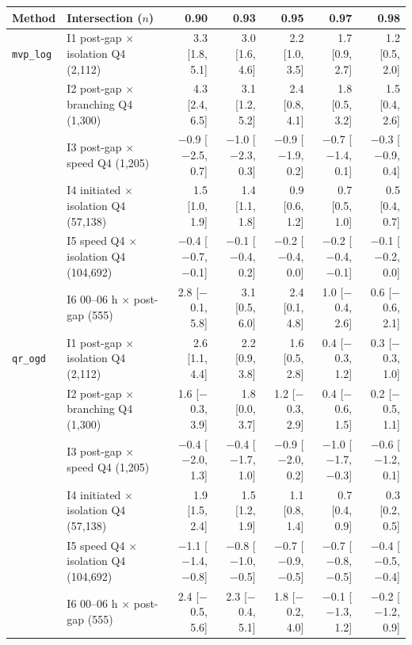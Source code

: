 \setlength{\tabcolsep}{3.4pt}
\begin{tabular}{@{}llrrrrr@{}}
\toprule
Method & Intersection ($n$) & 0.90 & 0.93 & 0.95 & 0.97 & 0.98 \\
\midrule
\texttt{mvp\_log} & I1 post-gap $\times$ isolation Q4 (2{,}112) & 3.3 [1.8, 5.1] & 3.0 [1.6, 4.6] & 2.2 [1.0, 3.5] & 1.7 [0.9, 2.7] & 1.2 [0.5, 2.0] \\
 & I2 post-gap $\times$ branching Q4 (1{,}300) & 4.3 [2.4, 6.5] & 3.1 [1.2, 5.2] & 2.4 [0.8, 4.1] & 1.8 [0.5, 3.2] & 1.5 [0.4, 2.6] \\
 & I3 post-gap $\times$ speed Q4 (1{,}205) & $-$0.9 [$-$2.5, 0.7] & $-$1.0 [$-$2.3, 0.3] & $-$0.9 [$-$1.9, 0.2] & $-$0.7 [$-$1.4, 0.1] & $-$0.3 [$-$0.9, 0.4] \\
 & I4 initiated $\times$ isolation Q4 (57{,}138) & 1.5 [1.0, 1.9] & 1.4 [1.1, 1.8] & 0.9 [0.6, 1.2] & 0.7 [0.5, 1.0] & 0.5 [0.4, 0.7] \\
 & I5 speed Q4 $\times$ isolation Q4 (104{,}692) & $-$0.4 [$-$0.7, $-$0.1] & $-$0.1 [$-$0.4, 0.2] & $-$0.2 [$-$0.4, 0.0] & $-$0.2 [$-$0.4, $-$0.1] & $-$0.1 [$-$0.2, 0.0] \\
 & I6 00--06 h $\times$ post-gap (555) & 2.8 [$-$0.1, 5.8] & 3.1 [0.5, 6.0] & 2.4 [0.1, 4.8] & 1.0 [$-$0.4, 2.6] & 0.6 [$-$0.6, 2.1] \\
\addlinespace[2pt]
\texttt{qr\_ogd} & I1 post-gap $\times$ isolation Q4 (2{,}112) & 2.6 [1.1, 4.4] & 2.2 [0.9, 3.8] & 1.6 [0.5, 2.8] & 0.4 [$-$0.3, 1.2] & 0.3 [$-$0.3, 1.0] \\
 & I2 post-gap $\times$ branching Q4 (1{,}300) & 1.6 [$-$0.3, 3.9] & 1.8 [0.0, 3.7] & 1.2 [$-$0.3, 2.9] & 0.4 [$-$0.6, 1.5] & 0.2 [$-$0.5, 1.1] \\
 & I3 post-gap $\times$ speed Q4 (1{,}205) & $-$0.4 [$-$2.0, 1.3] & $-$0.4 [$-$1.7, 1.0] & $-$0.9 [$-$2.0, 0.2] & $-$1.0 [$-$1.7, $-$0.3] & $-$0.6 [$-$1.2, 0.1] \\
 & I4 initiated $\times$ isolation Q4 (57{,}138) & 1.9 [1.5, 2.4] & 1.5 [1.2, 1.9] & 1.1 [0.8, 1.4] & 0.7 [0.4, 0.9] & 0.3 [0.2, 0.5] \\
 & I5 speed Q4 $\times$ isolation Q4 (104{,}692) & $-$1.1 [$-$1.4, $-$0.8] & $-$0.8 [$-$1.0, $-$0.5] & $-$0.7 [$-$0.9, $-$0.5] & $-$0.7 [$-$0.8, $-$0.5] & $-$0.4 [$-$0.5, $-$0.4] \\
 & I6 00--06 h $\times$ post-gap (555) & 2.4 [$-$0.5, 5.6] & 2.3 [$-$0.4, 5.1] & 1.8 [$-$0.2, 4.0] & $-$0.1 [$-$1.3, 1.2] & $-$0.2 [$-$1.2, 0.9] \\
\bottomrule
\end{tabular}
